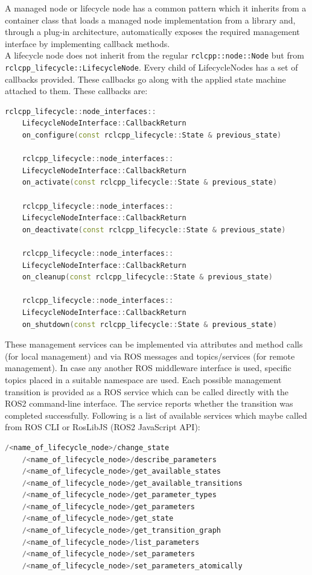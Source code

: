 	A managed node or lifecycle node has a common pattern which it inherits from a container class that loads a managed node implementation from a library and, through a plug-in architecture, automatically exposes the required management interface by implementing callback methods.\\ 
	\newpage
	A lifecycle node does not inherit from the regular \lstinline{rclcpp::node::Node} but from\\  \lstinline{rclcpp_lifecycle::LifecycleNode}. Every child of LifecycleNodes has a set of callbacks provided. These callbacks go along with the applied state machine attached to them. These callbacks are:

\begin{lstlisting}[language=cpp,
	caption={Transition Callbacks}, 
	label={code:TransitionCallbacks}]
	rclcpp_lifecycle::node_interfaces::
	LifecycleNodeInterface::CallbackReturn
	on_configure(const rclcpp_lifecycle::State & previous_state)

	rclcpp_lifecycle::node_interfaces::
	LifecycleNodeInterface::CallbackReturn
	on_activate(const rclcpp_lifecycle::State & previous_state)

	rclcpp_lifecycle::node_interfaces::
	LifecycleNodeInterface::CallbackReturn
	on_deactivate(const rclcpp_lifecycle::State & previous_state)

	rclcpp_lifecycle::node_interfaces::
	LifecycleNodeInterface::CallbackReturn
	on_cleanup(const rclcpp_lifecycle::State & previous_state)

	rclcpp_lifecycle::node_interfaces::
	LifecycleNodeInterface::CallbackReturn
	on_shutdown(const rclcpp_lifecycle::State & previous_state)

\end{lstlisting}

These management services can be implemented via attributes and method calls (for local management) and via ROS messages and topics/services (for remote management). In case any another ROS middleware interface is used, specific topics placed in a suitable namespace are used. Each possible management transition is provided as a ROS service which can be called directly with the ROS2 command-line interface. The service reports whether the transition was completed successfully. Following is a list of available services which maybe called from ROS CLI or RosLibJS (ROS2 JavaScript API): 

\begin{lstlisting}[language=cpp,
	caption={Available Services for a Lifecycle Node}, 
	label={code:ROS2:AvailableServices}]
	/<name_of_lifecycle_node>/change_state
	/<name_of_lifecycle_node>/describe_parameters
	/<name_of_lifecycle_node>/get_available_states
	/<name_of_lifecycle_node>/get_available_transitions
	/<name_of_lifecycle_node>/get_parameter_types
	/<name_of_lifecycle_node>/get_parameters
	/<name_of_lifecycle_node>/get_state
	/<name_of_lifecycle_node>/get_transition_graph
	/<name_of_lifecycle_node>/list_parameters
	/<name_of_lifecycle_node>/set_parameters
	/<name_of_lifecycle_node>/set_parameters_atomically
\end{lstlisting}

